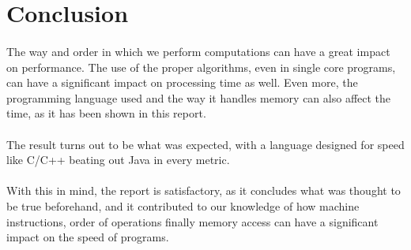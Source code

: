 \documentclass[11pt]{report}
\begin{document}
    \section*{Conclusion}

    \paragraph{}The way and order in which we perform computations can have a great impact on performance. The use of the proper algorithms, even in single core programs, can have a significant impact on processing time as well. Even more, the programming language used and the way it handles memory can also affect the time, as it has been shown in this report.

    \paragraph{}The result turns out to be what was expected, with a language designed for speed like C/C++ beating out Java in every metric.

    \paragraph{}With this in mind, the report is satisfactory, as it concludes what was thought to be true beforehand, and it contributed to our knowledge of how machine instructions, order of operations finally memory access can have a significant impact on the speed of programs.
\end{document}
